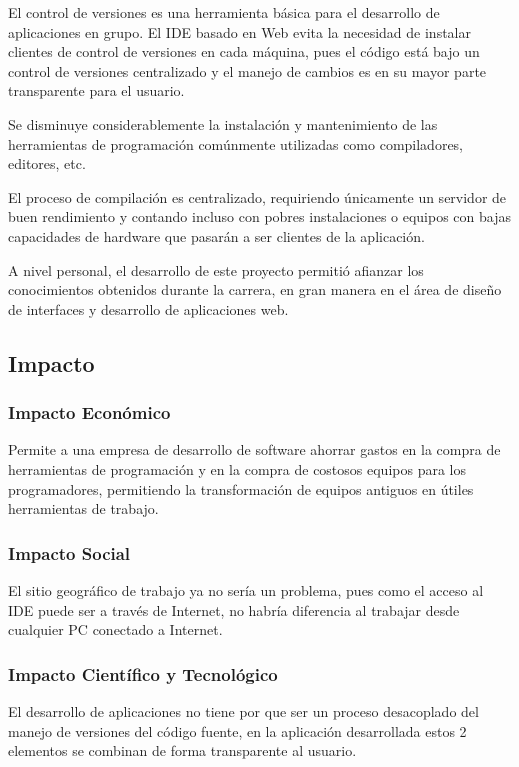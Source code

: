 El control de versiones es una herramienta básica para el desarrollo de aplicaciones en grupo. El IDE basado en Web evita la necesidad de instalar clientes de control de versiones en cada máquina, pues el código está bajo un control de versiones centralizado y el manejo de cambios es en su mayor parte transparente para el usuario.

Se disminuye considerablemente la instalación y mantenimiento de las herramientas de programación comúnmente utilizadas como compiladores, editores, etc.

El proceso de compilación es centralizado, requiriendo únicamente un servidor de buen rendimiento y contando incluso con pobres instalaciones o equipos con bajas capacidades de hardware que pasarán a ser clientes de la aplicación.

A nivel personal, el desarrollo de este proyecto permitió afianzar los conocimientos obtenidos durante la carrera, en gran manera en el área de diseño de interfaces y desarrollo de aplicaciones web.


\subsection{Impacto}

\subsubsection{Impacto Económico}

Permite a una empresa de desarrollo de software ahorrar gastos en la compra de herramientas de programación y en la compra de costosos equipos para los programadores, permitiendo la transformación de equipos antiguos en útiles herramientas de trabajo.

\subsubsection{Impacto Social}

El sitio geográfico de trabajo ya no sería un problema, pues como el acceso al IDE puede ser a través de Internet, no habría diferencia al trabajar desde cualquier PC conectado a Internet.

\subsubsection{Impacto Científico y Tecnológico}

El desarrollo de aplicaciones no tiene por que ser un proceso desacoplado del manejo de versiones del código fuente, en la aplicación desarrollada estos 2 elementos se combinan de forma transparente al usuario.

